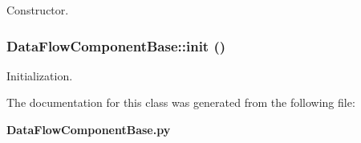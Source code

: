 Constructor. 

\subsubsection{\setlength{\rightskip}{0pt plus 5cm}Data\-Flow\-Component\-Base::init ()}\label{classDataFlowComponentBase_DataFlowComponentBasea2}


Initialization. 



The documentation for this class was generated from the following file:\begin{CompactItemize}
\item 
{\bf Data\-Flow\-Component\-Base.py}\end{CompactItemize}
